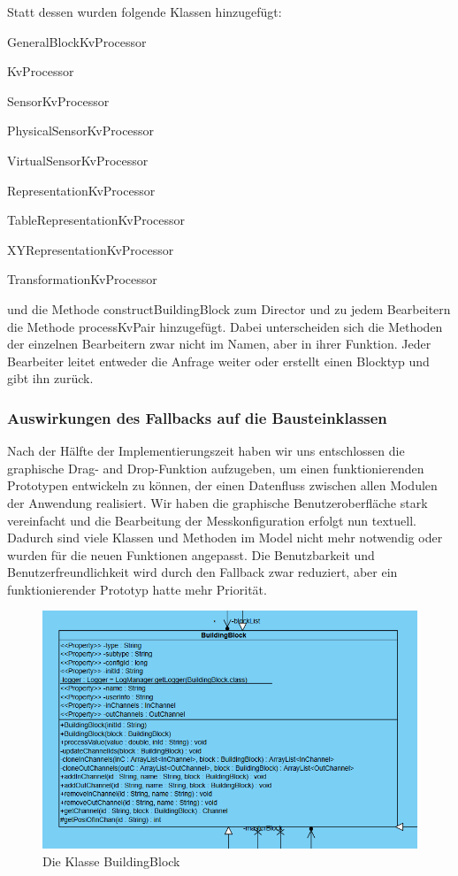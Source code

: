 \documentclass[parskip=full]{scrartcl}
\begin{document}
Statt dessen wurden folgende Klassen hinzugefügt:
\begin{description}
\item{} GeneralBlockKvProcessor
\item{} KvProcessor
\item{} SensorKvProcessor
\item{} PhysicalSensorKvProcessor
\item{} VirtualSensorKvProcessor
\item{} RepresentationKvProcessor
\item{} TableRepresentationKvProcessor
\item{} XYRepresentationKvProcessor
\item{} TransformationKvProcessor
\end{description}

und die Methode constructBuildingBlock zum Director und zu jedem Bearbeitern die Methode processKvPair hinzugefügt. Dabei unterscheiden sich die Methoden der einzelnen Bearbeitern zwar nicht im Namen, aber in ihrer Funktion. Jeder Bearbeiter leitet entweder die Anfrage weiter oder erstellt einen Blocktyp und gibt ihn zurück. 

\subsubsection{Auswirkungen des Fallbacks auf die Bausteinklassen}
Nach der Hälfte der Implementierungszeit haben wir uns entschlossen die graphische Drag- and Drop-Funktion aufzugeben, um einen funktionierenden Prototypen entwickeln zu können, der einen Datenfluss zwischen allen Modulen der Anwendung realisiert. Wir haben die graphische Benutzeroberfläche stark vereinfacht und die Bearbeitung der Messkonfiguration erfolgt nun textuell. Dadurch sind viele Klassen und Methoden im Model nicht mehr notwendig oder wurden für die neuen Funktionen angepasst. Die Benutzbarkeit und Benutzerfreundlichkeit wird durch den Fallback zwar reduziert, aber ein funktionierender Prototyp hatte mehr Priorität.


\begin{figure}[htbp]
	\begin{center}
		\includegraphics[width = 14cm]{Grafiken/buildingblock.PNG}
		\caption{Die Klasse BuildingBlock}
		\label{buildingblock}
	\end{center}
\end{figure}
\end{document}
